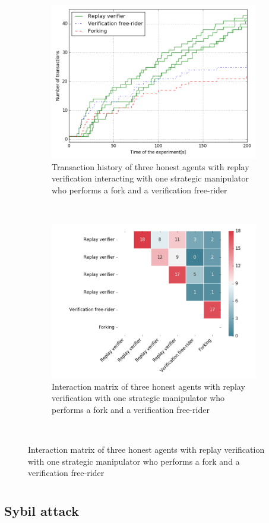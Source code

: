 \begin{figure}
    \begin{subfigure}{\textwidth}
      \centering
      \includegraphics[width=.6\linewidth]{images/verification_doublespending}
      \caption{Transaction history of three honest agents with replay verification interacting with one strategic manipulator who performs a fork and a verification free-rider}
      \label{fig:verification_doublespending}
    \end{subfigure}\\
    \begin{subfigure}{\textwidth}
      \centering
      \includegraphics[width=.6\linewidth]{images/verification_doublespending_matrix}
      \caption{Interaction matrix of three honest agents with replay verification with one strategic manipulator who performs a fork and a verification free-rider}
      \label{fig:verification_doublespending_matrix}
    \end{subfigure}\\
\end{figure}

\section{}

\subsection{Sybil attack}